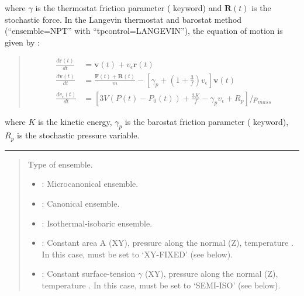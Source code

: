 \documentclass[a4paper,11pt,oneside,english]{sphinxmanual}
\begin{document}
where \(\gamma\) is the thermostat friction parameter ( keyword)
and \(\mathbf{R}(t)\) is the stochastic force.
In the Langevin thermostat and barostat method (“ensemble=NPT” with
“tpcontrol=LANGEVIN”),
the equation of motion is given by :
\begin{quote}

\vspace{-5mm}
\begin{equation*}
\begin{split}\frac{d\mathbf{r}(t)}{dt} & = \mathbf{v}(t)+v_{\epsilon}\mathbf{r}(t) \\ \frac{d\mathbf{v}(t)}{dt} & = \frac{\mathbf{F}(t)+\mathbf{R}(t)}{m}-[\gamma_p+(1+\frac{3}{f})v_{\epsilon}]\mathbf{v}(t) \\ \frac{dv_{\epsilon}(t)}{dt} & = [3V(P(t)-P_0(t))+\frac{3K}{f}-\gamma_p v_{\epsilon} + R_p ] / p_{mass}\end{split}
\end{equation*}
\vspace{-3mm}
\end{quote}

where \(K\) is the kinetic energy, \(\gamma_p\) is the barostat
friction parameter ( keyword), \(R_p\) is the stochastic
pressure variable.


\bigskip\hrule\bigskip


 
\begin{quote}


Type of ensemble.
\begin{itemize}
\item {} 
: Microcanonical ensemble.

\item {} 
: Canonical ensemble.

\item {} 
: Isothermal-isobaric ensemble.

\item {} 
: Constant area A (XY), pressure along the normal (Z), temperature
. In this case,  must be set to ‘XY-FIXED’ (see below).

\item {} 
: Constant surface-tension \(\gamma\) (XY), pressure along the normal (Z),
temperature . In this case,  must be set to ‘SEMI-ISO’ (see below).

\end{itemize}
\end{quote}
\end{document}
